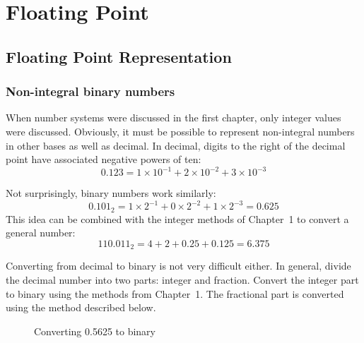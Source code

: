 \chapter{Floating Point}

\section{Floating Point Representation}

\subsection{Non-integral binary numbers}

When number systems were discussed in the first chapter, only integer values
were discussed. Obviously, it must be possible to represent non-integral
numbers in other bases as well as decimal. In decimal, digits to the right
of the decimal point have associated negative powers of ten:
\[ 0.123 = 1 \times 10^{-1} + 2 \times 10^{-2} + 3 \times 10^{-3} \]

Not surprisingly, binary numbers work similarly:
\[ 0.101_2 = 1 \times 2^{-1} + 0 \times 2^{-2} + 1 \times 2^{-3} = 0.625 \]
This idea can be combined with the integer methods of Chapter~1 to convert
a general number:
\[ 110.011_2 = 4 + 2 + 0.25 + 0.125 = 6.375 \]

Converting from decimal to binary is not very difficult either. In general,
divide the decimal number into two parts: integer and fraction. Convert the
integer part to binary using the methods from Chapter~1. The fractional part
is converted using the method described below.

\begin{figure}[t]
\centering
{}
\caption{Converting 0.5625 to binary\label{fig:binConvert1}}
\end{figure}

